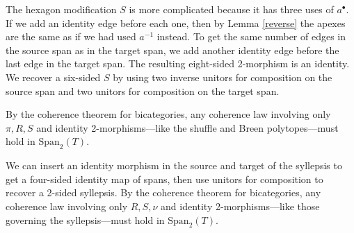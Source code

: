 \documentclass[12pt,twoside,openright]{report}
\newcommand{\Span}{\mbox{Span}}
\begin{document}
The hexagon modification $S$ is more complicated because it has three uses of $a^\bullet.$  If we add an identity edge before each one, then by Lemma \ref{reverse} the apexes are the same as if we had used $a^{-1}$ instead.  To get the same number of edges in the source span as in the target span, we add another identity edge before the last edge in the target span.  The resulting eight-sided 2-morphism is an identity.  We recover a six-sided $S$ by using two inverse unitors for composition on the source span and two unitors for composition on the target span.

By the coherence theorem for bicategories, any coherence law involving only $\pi, R, S$ and identity 2-morphisms---like the shuffle and Breen polytopes---must hold in $\Span_2(T).$

\begin{center}
\end{center}

We can insert an identity morphism in the source and target of the syllepsis to get a four-sided identity map of spans, then use unitors for composition to recover a 2-sided syllepsis.  By the coherence theorem for bicategories, any coherence law involving only $R, S, \nu$ and identity 2-morphisms---like those governing the syllepsis---must hold in $\Span_2(T).$
\end{document}
